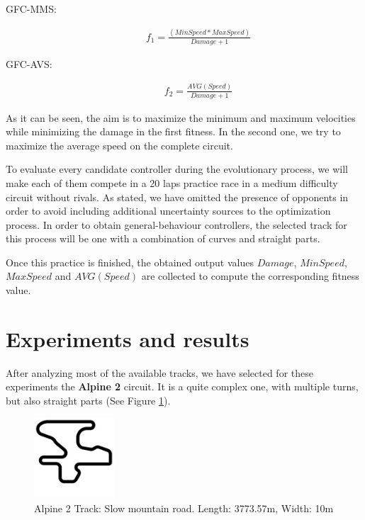 \documentclass[conference]{IEEEtran}
\begin{document}
\begin{description}
	\item[GFC-MMS:]  
	\begin{equation} \label{fit1}
	\begin{array}{ll}
	f_{1} =   \frac{(MinSpeed*MaxSpeed) }{Damage+1}
	\end{array}
	\end{equation}
	\item[GFC-AVS:] 
	\begin{equation} \label{fit2}
	\begin{array}{lll}
	f_{2}= \frac{AVG(Speed)}{Damage+1}
	\end{array}
	\end{equation}	
\end{description} 

As it can be seen, the aim is to maximize the minimum and maximum velocities while minimizing the damage in the first fitness. In the second one, we try to maximize the average speed on the complete circuit.

To evaluate every candidate controller during the evolutionary process, we will make each of them compete in a 20 laps practice race in a medium difficulty circuit without rivals. As stated, we have omitted the presence of opponents in order to avoid including additional uncertainty sources to the optimization process. In order to obtain general-behaviour controllers, the selected track for this process will be one with a combination of curves and straight parts.

Once this practice is finished, the obtained output values $Damage$, $MinSpeed$, $MaxSpeed$ and $AVG(Speed)$ are collected to compute the corresponding fitness value.



\section{Experiments and results}  
\label{sec:results}

After analyzing most of the available tracks, we have selected for these experiments the \textbf{Alpine 2} circuit. It is a quite complex one, with multiple turns, but also straight parts (See Figure \ref{fig:alpine2_track}).

\begin{figure}[!ht]	
  \begin{center}
    \includegraphics[width=3cm]{fig/alpine2.jpg}
    \caption{Alpine 2 Track: Slow mountain road. Length: 3773.57m, Width: 10m}
    \label{fig:alpine2_track}	
  \end{center}	
\end{figure}
\end{document}
